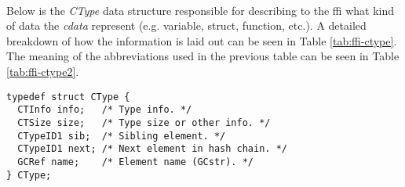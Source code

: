 \\
Below is the \emph{CType} data structure responsible for describing to the ffi
what kind of data the \emph{cdata} represent (e.g. variable, struct,
function, etc.). A detailed breakdown of how the information is laid out can
be seen in Table \ref{tab:ffi-ctype}. The meaning of the abbreviations used in
the previous table can be seen in Table \ref{tab:ffi-ctype2}.
\begin{lstlisting}[style=CStyle]
typedef struct CType {
  CTInfo info;   /* Type info. */
  CTSize size;   /* Type size or other info. */
  CTypeID1 sib;  /* Sibling element. */
  CTypeID1 next; /* Next element in hash chain. */
  GCRef name;    /* Element name (GCstr). */
} CType;
\end{lstlisting}

